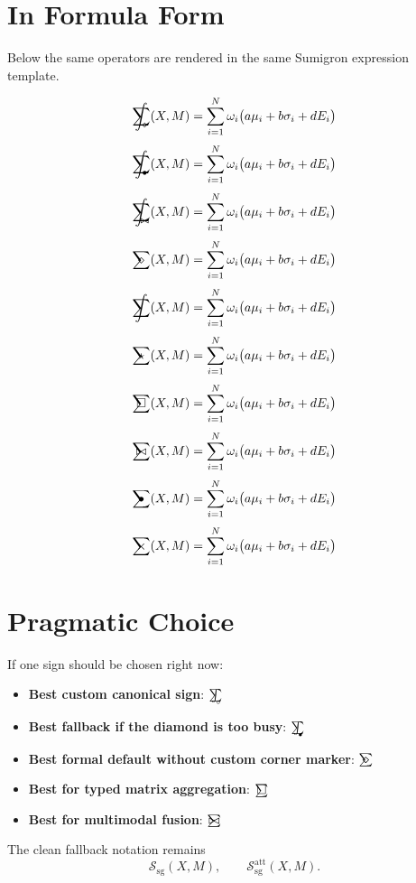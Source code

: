 \documentclass[12pt]{article}
\newcommand{\sgoverlay}[2]{\mathop{\mathchoice
  {\ooalign{\hfil$\displaystyle\sum$\hfil\cr\hfil$#1$\hfil\cr}}
  {\ooalign{\hfil$\textstyle\sum$\hfil\cr\hfil$#2$\hfil\cr}}
  {\ooalign{\hfil$\scriptstyle\sum$\hfil\cr\hfil$#2$\hfil\cr}}
  {\ooalign{\hfil$\scriptscriptstyle\sum$\hfil\cr\hfil$#2$\hfil\cr}}
}}
\newcommand{\sgsumintright}[1]{\mathop{\mathchoice
  {\ooalign{
    \hfil$\displaystyle\sum$\hfil\cr
    \hfil$\displaystyle\int$\hfil\cr
    \hidewidth\raisebox{-1.35ex}{\kern1.25ex$\scriptstyle #1$}\hidewidth\cr
  }}
  {\ooalign{
    \hfil$\textstyle\sum$\hfil\cr
    \hfil$\textstyle\int$\hfil\cr
    \hidewidth\raisebox{-1.00ex}{\kern1.00ex$\scriptscriptstyle #1$}\hidewidth\cr
  }}
  {\ooalign{
    \hfil$\scriptstyle\sum$\hfil\cr
    \hfil$\scriptstyle\int$\hfil\cr
    \hidewidth\raisebox{-0.75ex}{\kern0.75ex$\scriptscriptstyle #1$}\hidewidth\cr
  }}
  {\ooalign{
    \hfil$\scriptscriptstyle\sum$\hfil\cr
    \hfil$\scriptscriptstyle\int$\hfil\cr
    \hidewidth\raisebox{-0.60ex}{\kern0.55ex$\scriptscriptstyle #1$}\hidewidth\cr
  }}
}}
\newcommand{\sgdiamond}{\sgoverlay{\displaystyle\diamond}{\textstyle\diamond}}
\newcommand{\sgint}{\sgoverlay{\displaystyle\int}{\textstyle\int}}
\newcommand{\sgstar}{\sgoverlay{\displaystyle\star}{\textstyle\star}}
\newcommand{\sgsquare}{\sgoverlay{\displaystyle\square}{\textstyle\square}}
\newcommand{\sgbowtie}{\sgoverlay{\displaystyle\bowtie}{\textstyle\bowtie}}
\newcommand{\sgbullet}{\sgoverlay{\displaystyle\bullet}{\textstyle\bullet}}
\newcommand{\sgtimes}{\sgoverlay{\displaystyle\times}{\textstyle\times}}
\newcommand{\sgfinaldiamond}{\sgsumintright{\diamond}}
\newcommand{\sgfinalbullet}{\sgsumintright{\bullet}}
\newcommand{\sgfinalbowtie}{\sgsumintright{\bowtie}}
\newcommand{\sampleexpr}[1]{\[
  #1(X,M)=\sum_{i=1}^{N}\omega_i\bigl(a\mu_i+b\sigma_i+dE_i\bigr)
\]}
\begin{document}
\section*{In Formula Form}
Below the same operators are rendered in the same Sumigron expression template.

\sampleexpr{\sgfinaldiamond}
\sampleexpr{\sgfinalbullet}
\sampleexpr{\sgfinalbowtie}
\sampleexpr{\sgdiamond}
\sampleexpr{\sgint}
\sampleexpr{\sgstar}
\sampleexpr{\sgsquare}
\sampleexpr{\sgbowtie}
\sampleexpr{\sgbullet}
\sampleexpr{\sgtimes}

\section*{Pragmatic Choice}
If one sign should be chosen right now:
\begin{itemize}
\item \textbf{Best custom canonical sign}: \(\sgfinaldiamond\)
\item \textbf{Best fallback if the diamond is too busy}: \(\sgfinalbullet\)
\item \textbf{Best formal default without custom corner marker}: \(\sgdiamond\)
\item \textbf{Best for typed matrix aggregation}: \(\sgsquare\)
\item \textbf{Best for multimodal fusion}: \(\sgbowtie\)
\end{itemize}

\noindent
The clean fallback notation remains
\[
\mathcal{S}_{\mathrm{sg}}(X,M), \qquad
\mathcal{S}^{\mathrm{att}}_{\mathrm{sg}}(X,M).
\]
\end{document}
